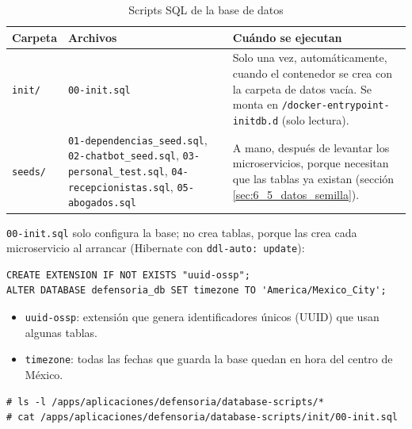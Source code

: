 \begin{table}[H]
\centering
\caption{Scripts SQL de la base de datos}
\small
\begin{tabular}{p{2.2cm}p{4.6cm}p{7.6cm}}
\toprule
\textbf{Carpeta} & \textbf{Archivos} & \textbf{Cuándo se ejecutan} \\
\midrule
\texttt{init/} & \texttt{00-init.sql} & Solo una vez, automáticamente, cuando el contenedor se crea con la carpeta de datos vacía. Se monta en \texttt{/docker-entrypoint-initdb.d} (solo lectura). \\
\texttt{seeds/} & \texttt{01-dependencias\_seed.sql}, \texttt{02-chatbot\_seed.sql}, \texttt{03-personal\_test.sql}, \texttt{04-recepcionistas.sql}, \texttt{05-abogados.sql} & A mano, después de levantar los microservicios, porque necesitan que las tablas ya existan (sección \ref{sec:6_5_datos_semilla}). \\
\bottomrule
\end{tabular}
\end{table}

\texttt{00-init.sql} solo configura la base; no crea tablas, porque las crea cada microservicio al arrancar (Hibernate con \texttt{ddl-auto: update}):
\begin{lstlisting}
CREATE EXTENSION IF NOT EXISTS "uuid-ossp";
ALTER DATABASE defensoria_db SET timezone TO 'America/Mexico_City';
\end{lstlisting}
\begin{itemize}
  \item \texttt{uuid-ossp}: extensión que genera identificadores únicos (UUID) que usan algunas tablas.
  \item \texttt{timezone}: todas las fechas que guarda la base quedan en hora del centro de México.
\end{itemize}
\begin{lstlisting}
# ls -l /apps/aplicaciones/defensoria/database-scripts/*
# cat /apps/aplicaciones/defensoria/database-scripts/init/00-init.sql
\end{lstlisting}
